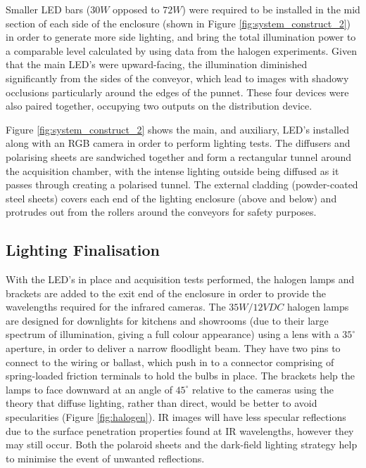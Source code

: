 \documentclass[fleqn,twoside,12pt]{report}
\begin{document}
Smaller LED bars ($30W$ opposed to $72W$) were required to be installed in the mid section of each side of the enclosure (shown in Figure \ref{fig:system_construct_2}) in order to generate more side lighting, and bring the total illumination power to a comparable level calculated by using data from the halogen experiments. Given that the main LED's were upward-facing, the illumination diminished significantly from the sides of the conveyor, which lead to images with shadowy occlusions particularly around the edges of the punnet. These four devices were also paired together, occupying two outputs on the distribution device. 


Figure \ref{fig:system_construct_2} shows the main, and auxiliary, LED's installed along with an RGB camera in order to perform lighting tests. The diffusers and polarising sheets are sandwiched together and form a rectangular tunnel around the acquisition chamber, with the intense lighting outside being diffused as it passes through creating a polarised tunnel. The external cladding (powder-coated steel sheets) covers each end of the lighting enclosure (above and below) and protrudes out from the rollers around the conveyors for safety purposes. 


\subsection{Lighting Finalisation}


With the LED's in place and acquisition tests performed, the halogen lamps and brackets are added to the exit end of the enclosure in order to provide the wavelengths required for the infrared cameras. The $35W/12VDC$ halogen lamps are designed for downlights for kitchens and showrooms (due to their large spectrum of illumination, giving a full colour appearance) using a lens with a $35^{\circ}$ aperture, in order to deliver a narrow floodlight beam. They have two pins to connect to the wiring or ballast, which push in to a connector comprising of spring-loaded friction terminals to hold the bulbs in place. The brackets help the lamps to face downward at an angle of $45^{\circ}$ relative to the cameras using the theory that diffuse lighting, rather than direct, would be better to avoid specularities (Figure \ref{fig:halogen}). IR images will have less specular reflections due to the surface penetration properties found at IR wavelengths, however they may still occur. Both the polaroid sheets and the dark-field lighting strategy help to minimise the event of unwanted reflections.
\end{document}
